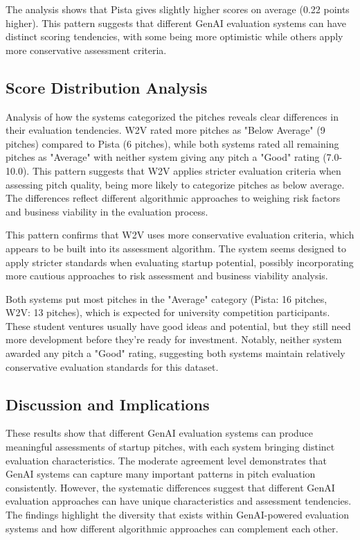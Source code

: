 The analysis shows that Pista gives slightly higher scores on average (0.22 points higher). This pattern suggests that different GenAI evaluation systems can have distinct scoring tendencies, with some being more optimistic while others apply more conservative assessment criteria.

\subsection{Score Distribution Analysis}

Analysis of how the systems categorized the pitches reveals clear differences in their evaluation tendencies. W2V rated more pitches as "Below Average" (9 pitches) compared to Pista (6 pitches), while both systems rated all remaining pitches as "Average" with neither system giving any pitch a "Good" rating (7.0-10.0). This pattern suggests that W2V applies stricter evaluation criteria when assessing pitch quality, being more likely to categorize pitches as below average. The differences reflect different algorithmic approaches to weighing risk factors and business viability in the evaluation process.

This pattern confirms that W2V uses more conservative evaluation criteria, which appears to be built into its assessment algorithm. The system seems designed to apply stricter standards when evaluating startup potential, possibly incorporating more cautious approaches to risk assessment and business viability analysis.

Both systems put most pitches in the "Average" category (Pista: 16 pitches, W2V: 13 pitches), which is expected for university competition participants. These student ventures usually have good ideas and potential, but they still need more development before they're ready for investment. Notably, neither system awarded any pitch a "Good" rating, suggesting both systems maintain relatively conservative evaluation standards for this dataset.

\subsection{Discussion and Implications}

These results show that different GenAI evaluation systems can produce meaningful assessments of startup pitches, with each system bringing distinct evaluation characteristics. The moderate agreement level demonstrates that GenAI systems can capture many important patterns in pitch evaluation consistently. However, the systematic differences suggest that different GenAI evaluation approaches can have unique characteristics and assessment tendencies. The findings highlight the diversity that exists within GenAI-powered evaluation systems and how different algorithmic approaches can complement each other.

